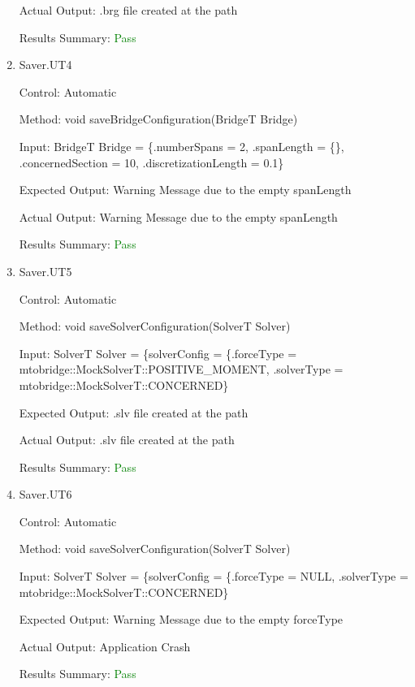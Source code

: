 \documentclass[12pt, titlepage]{article}
\begin{document}
\begin{enumerate}
    Actual Output: .brg file created at the path

    Results Summary: \textcolor{green} {Pass}

    \item{Saver.UT4\\}
    
    Control: Automatic
    
    Method:  void saveBridgeConfiguration(BridgeT Bridge)
    
    Input: BridgeT Bridge = \{.numberSpans = 2,
                         .spanLength = \{\},
                         .concernedSection = 10,
                         .discretizationLength = 0.1\}
    
    Expected Output: Warning Message due to the empty spanLength

    Actual Output: Warning Message due to the empty spanLength

    Results Summary: \textcolor{green} {Pass}

    \item{Saver.UT5\\}
    
    Control: Automatic
    
    Method:  void saveSolverConfiguration(SolverT Solver)
    
    Input: SolverT Solver = \{solverConfig = \{.forceType = mtobridge::MockSolverT::POSITIVE\_MOMENT,
                         .solverType = mtobridge::MockSolverT::CONCERNED\}
    
    Expected Output: .slv file created at the path

    Actual Output: .slv file created at the path

    Results Summary: \textcolor{green} {Pass}

    \item{Saver.UT6\\}
    
    Control: Automatic
    
    Method:  void saveSolverConfiguration(SolverT Solver)
    
    Input: SolverT Solver = \{solverConfig = \{.forceType = NULL,
                         .solverType = mtobridge::MockSolverT::CONCERNED\}
    
    Expected Output: Warning Message due to the empty forceType

    Actual Output: Application Crash

    Results Summary: \textcolor{green} {Pass}
    
\end{enumerate}
\end{document}
